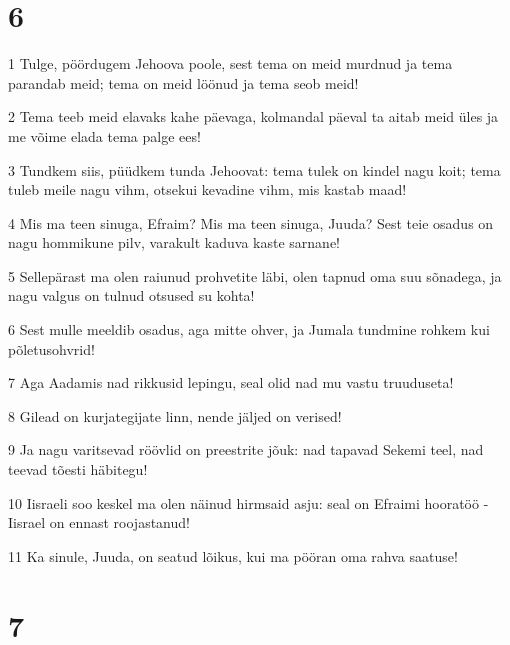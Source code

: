 \chapter{6}

\par 1 Tulge, pöördugem Jehoova poole, sest tema on meid murdnud ja tema parandab meid; tema on meid löönud ja tema seob meid!
\par 2 Tema teeb meid elavaks kahe päevaga, kolmandal päeval ta aitab meid üles ja me võime elada tema palge ees!
\par 3 Tundkem siis, püüdkem tunda Jehoovat: tema tulek on kindel nagu koit; tema tuleb meile nagu vihm, otsekui kevadine vihm, mis kastab maad!
\par 4 Mis ma teen sinuga, Efraim? Mis ma teen sinuga, Juuda? Sest teie osadus on nagu hommikune pilv, varakult kaduva kaste sarnane!
\par 5 Sellepärast ma olen raiunud prohvetite läbi, olen tapnud oma suu sõnadega, ja nagu valgus on tulnud otsused su kohta!
\par 6 Sest mulle meeldib osadus, aga mitte ohver, ja Jumala tundmine rohkem kui põletusohvrid!
\par 7 Aga Aadamis nad rikkusid lepingu, seal olid nad mu vastu truuduseta!
\par 8 Gilead on kurjategijate linn, nende jäljed on verised!
\par 9 Ja nagu varitsevad röövlid on preestrite jõuk: nad tapavad Sekemi teel, nad teevad tõesti häbitegu!
\par 10 Iisraeli soo keskel ma olen näinud hirmsaid asju: seal on Efraimi hooratöö - Iisrael on ennast roojastanud!
\par 11 Ka sinule, Juuda, on seatud lõikus, kui ma pööran oma rahva saatuse!

\chapter{7}

